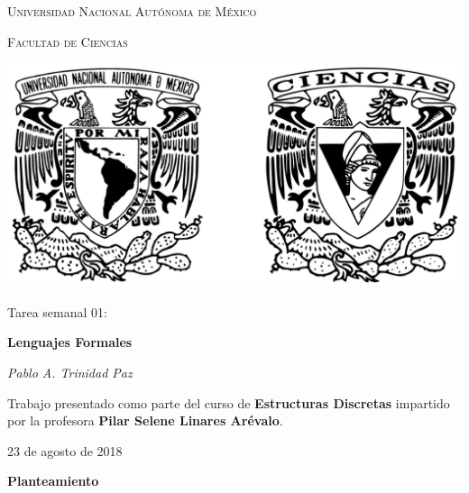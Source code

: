 \documentclass[11pt,letterpaper]{article}
\begin{document}
\begin{titlepage}
    \centering

    {\scshape\LARGE Universidad Nacional Autónoma de México \par}

    \vspace{1cm}
    {\scshape\Large Facultad de Ciencias\par}
    \vspace{1.5cm}

    \begin{center}
        \includegraphics[scale=.1]{../../assets/img/logo.png}
    \end{center}

    \vspace{.8 cm}

    {\LARGE Tarea semanal 01: \par}
    {\huge\bfseries Lenguajes Formales \par}

    \vspace{0.5cm}
    {\large\itshape Pablo A. Trinidad Paz\par}

    \vfill

    Trabajo presentado como parte del curso de \textbf{Estructuras Discretas}
    impartido por la profesora \textbf{Pilar Selene Linares Arévalo}. \par
    \vspace{0.1cm}
    {\large 23 de agosto de 2018\par}
\end{titlepage}

{\large \bfseries Planteamiento \par}
\end{document}
